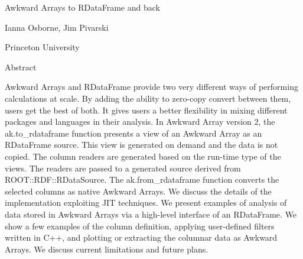 Awkward Arrays to RDataFrame and back

Ianna Osborne, Jim Pivarski

Princeton University

Abstract

Awkward Arrays and RDataFrame provide two very different ways of performing calculations at scale. By adding the ability to zero-copy convert between them, users get the best of both. It gives users a better flexibility in mixing different packages and languages in their analysis. In Awkward Array version 2, the ak.to_rdataframe function presents a view of an Awkward Array as an RDataFrame source. This view is generated on demand and the data is not copied. The column readers are generated based on the run-time type of the views. The readers are passed to a generated source derived from ROOT::RDF::RDataSource. The ak.from_rdataframe function converts the selected columns as native Awkward Arrays. We discuss the details of the implementation exploiting JIT techniques. We present examples of analysis of data stored in Awkward Arrays via a high-level interface of an RDataFrame. We show a few examples of the column definition, applying user-defined filters written in C++, and plotting or extracting the columnar data as Awkward Arrays. We discuss current limitations and future plans.

